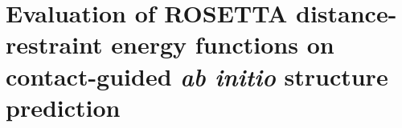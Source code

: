 \documentclass[11pt,oneside,leqno,openright]{report}
\begin{document}
% 
%
% 
%
%
%

\tableofcontents

%

% 

\chapter{Evaluation of ROSETTA distance-restraint energy functions on contact-guided \textit{ab initio} structure prediction}


% 
%
% 

\printbibliography[
    heading=bibintoc,
]
\end{document}
